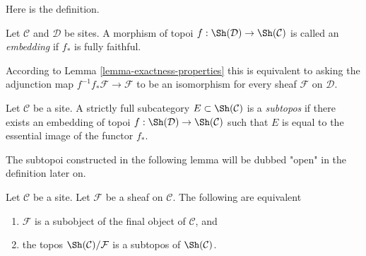 \noindent
Here is the definition.

\begin{definition}
\label{definition-embedding}
Let $\mathcal{C}$ and $\mathcal{D}$ be sites.
A morphism of topoi $f : \Sh(\mathcal{D}) \to \Sh(\mathcal{C})$
is called an {\it embedding} if $f_*$ is fully faithful.
\end{definition}

\noindent
According to Lemma \ref{lemma-exactness-properties}
this is equivalent to asking the
adjunction map $f^{-1}f_*\mathcal{F} \to \mathcal{F}$
to be an isomorphism for every sheaf $\mathcal{F}$ on $\mathcal{D}$.

\begin{definition}
\label{definition-subtopos}
Let $\mathcal{C}$ be a site. A strictly full subcategory
$E \subset \Sh(\mathcal{C})$ is a {\it subtopos} if there
exists an embedding of topoi $f : \Sh(\mathcal{D}) \to \Sh(\mathcal{C})$
such that $E$ is equal to the essential image of the functor $f_*$.
\end{definition}

\noindent
The subtopoi constructed in the following lemma will be dubbed
"open" in the definition later on.

\begin{lemma}
\label{lemma-open-subtopos}
Let $\mathcal{C}$ be a site. Let $\mathcal{F}$ be a sheaf on
$\mathcal{C}$. The following are equivalent
\begin{enumerate}
\item $\mathcal{F}$ is a subobject of the final object of $\mathcal{C}$, and
\item the topos $\Sh(\mathcal{C})/\mathcal{F}$ is a subtopos of
$\Sh(\mathcal{C})$.
\end{enumerate}
\end{lemma}

